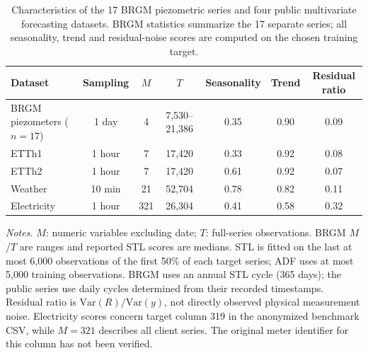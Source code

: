 \begin{table}[t]
\centering
\caption{Characteristics of the 17 BRGM piezometric series and four public multivariate forecasting datasets. BRGM statistics summarize the 17 separate series; all seasonality, trend and residual-noise scores are computed on the chosen training target.}
\label{tab:dataset_characteristics}
\footnotesize
\setlength{\tabcolsep}{4pt}
\begin{tabular}{@{}lcccccc@{}}
\toprule
Dataset & Sampling & $M$ & $T$ & Seasonality & Trend & Residual ratio \\
\midrule
BRGM piezometers ($n=17$) & 1 day & 4 & 7,530--21,386 & 0.35 & 0.90 & 0.09 \\
\midrule
ETTh1 & 1 hour & 7 & 17,420 & 0.33 & 0.92 & 0.08 \\
ETTh2 & 1 hour & 7 & 17,420 & 0.61 & 0.92 & 0.07 \\
Weather & 10 min & 21 & 52,704 & 0.78 & 0.82 & 0.11 \\
Electricity & 1 hour & 321 & 26,304 & 0.41 & 0.58 & 0.32 \\
\bottomrule
\end{tabular}
\vspace{1mm}
\parbox{0.98\textwidth}{\scriptsize \textit{Notes.} $M$: numeric variables excluding date; $T$: full-series observations. BRGM $M$/$T$ are ranges and reported STL scores are medians. STL is fitted on the last at most 6,000 observations of the first 50\% of each target series; ADF uses at most 5,000 training observations. BRGM uses an annual STL cycle (365 days); the public series use daily cycles determined from their recorded timestamps. Residual ratio is $\mathrm{Var}(R)/\mathrm{Var}(y)$, not directly observed physical measurement noise. Electricity scores concern target column 319 in the anonymized benchmark CSV, while $M=321$ describes all client series. The original meter identifier for this column has not been verified.}
\end{table}

